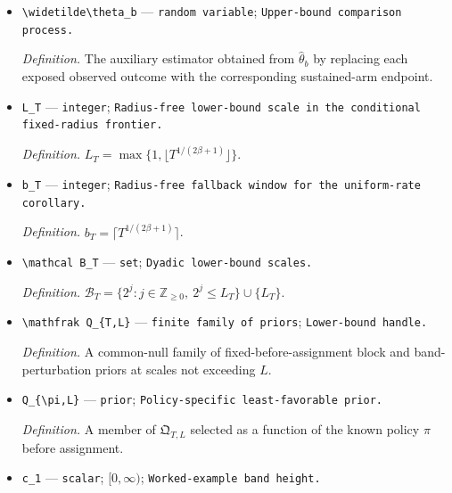 \documentclass{article}
\begin{document}
\begin{itemize}
  \par\smallskip\noindent\emph{Definition.} The truncated homogeneous-history Horvitz--Thompson estimator at scale \(b\).
  \item \texttt{\textbackslash{}\allowbreak{}widetilde\textbackslash{}\allowbreak{}theta\_\allowbreak{}b} --- \texttt{random variable}; \texttt{Upper-\allowbreak{}bound comparison process.}
  \par\smallskip\noindent\emph{Definition.} The auxiliary estimator obtained from \(\widehat\theta_b\) by replacing each exposed observed outcome with the corresponding sustained-arm endpoint.
  \item \texttt{L\_\allowbreak{}T} --- \texttt{integer}; \texttt{Radius-\allowbreak{}free lower-\allowbreak{}bound scale in the conditional fixed-\allowbreak{}radius frontier.}
  \par\smallskip\noindent\emph{Definition.} \(L_T=\max\{1,\lfloor T^{1/(2\beta+1)}\rfloor\}\).
  \item \texttt{b\_\allowbreak{}T} --- \texttt{integer}; \texttt{Radius-\allowbreak{}free fallback window for the uniform-\allowbreak{}rate corollary.}
  \par\smallskip\noindent\emph{Definition.} \(b_T=\lceil T^{1/(2\beta+1)}\rceil\).
  \item \texttt{\textbackslash{}\allowbreak{}mathcal B\_\allowbreak{}T} --- \texttt{set}; \texttt{Dyadic lower-\allowbreak{}bound scales.}
  \par\smallskip\noindent\emph{Definition.} \(\mathcal B_T=\{2^j:j\in\mathbb Z_{\ge0},\ 2^j\le L_T\}\cup\{L_T\}\).
  \item \texttt{\textbackslash{}\allowbreak{}mathfrak Q\_\allowbreak{}\{T,\allowbreak{}L\}\allowbreak{}} --- \texttt{finite family of priors}; \texttt{Lower-\allowbreak{}bound handle.}
  \par\smallskip\noindent\emph{Definition.} A common-null family of fixed-before-assignment block and band-perturbation priors at scales not exceeding \(L\).
  \item \texttt{Q\_\allowbreak{}\{\textbackslash{}\allowbreak{}pi,\allowbreak{}L\}\allowbreak{}} --- \texttt{prior}; \texttt{Policy-\allowbreak{}specific least-\allowbreak{}favorable prior.}
  \par\smallskip\noindent\emph{Definition.} A member of \(\mathfrak Q_{T,L}\) selected as a function of the known policy \(\pi\) before assignment.
  \item \texttt{c\_\allowbreak{}1} --- \texttt{scalar}; \([0,\infty)\); \texttt{Worked-\allowbreak{}example band height.}

\end{itemize}
\end{document}
